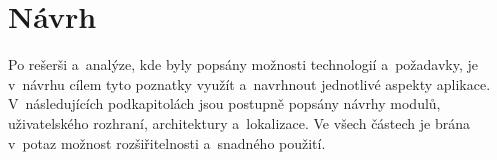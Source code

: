 \chapter{Návrh}
\label{chap:design}

Po rešerši a~analýze,
kde byly popsány možnosti technologií a~požadavky,
je v~návrhu cílem tyto poznatky využít a~navrhnout jednotlivé aspekty aplikace.
V~následujících podkapitolách jsou postupně popsány návrhy modulů,
uživatelského rozhraní, architektury a~lokalizace.
Ve všech částech je brána v~potaz možnost rozšiřitelnosti a~snadného použití.   




